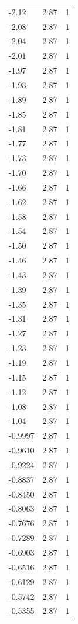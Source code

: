 \begin{longtable}{lrr}
  -2.12 & 2.87 & 1 \\
  -2.08 & 2.87 & 1 \\
  -2.04 & 2.87 & 1 \\
  -2.01 & 2.87 & 1 \\
  -1.97 & 2.87 & 1 \\
  -1.93 & 2.87 & 1 \\
  -1.89 & 2.87 & 1 \\
  -1.85 & 2.87 & 1 \\
  -1.81 & 2.87 & 1 \\
  -1.77 & 2.87 & 1 \\
  -1.73 & 2.87 & 1 \\
  -1.70 & 2.87 & 1 \\
  -1.66 & 2.87 & 1 \\
  -1.62 & 2.87 & 1 \\
  -1.58 & 2.87 & 1 \\
  -1.54 & 2.87 & 1 \\
  -1.50 & 2.87 & 1 \\
  -1.46 & 2.87 & 1 \\
  -1.43 & 2.87 & 1 \\
  -1.39 & 2.87 & 1 \\
  -1.35 & 2.87 & 1 \\
  -1.31 & 2.87 & 1 \\
  -1.27 & 2.87 & 1 \\
  -1.23 & 2.87 & 1 \\
  -1.19 & 2.87 & 1 \\
  -1.15 & 2.87 & 1 \\
  -1.12 & 2.87 & 1 \\
  -1.08 & 2.87 & 1 \\
  -1.04 & 2.87 & 1 \\
  -0.9997 & 2.87 & 1 \\
  -0.9610 & 2.87 & 1 \\
  -0.9224 & 2.87 & 1 \\
  -0.8837 & 2.87 & 1 \\
  -0.8450 & 2.87 & 1 \\
  -0.8063 & 2.87 & 1 \\
  -0.7676 & 2.87 & 1 \\
  -0.7289 & 2.87 & 1 \\
  -0.6903 & 2.87 & 1 \\
  -0.6516 & 2.87 & 1 \\
  -0.6129 & 2.87 & 1 \\
  -0.5742 & 2.87 & 1 \\
  -0.5355 & 2.87 & 1 \\

\end{longtable}
